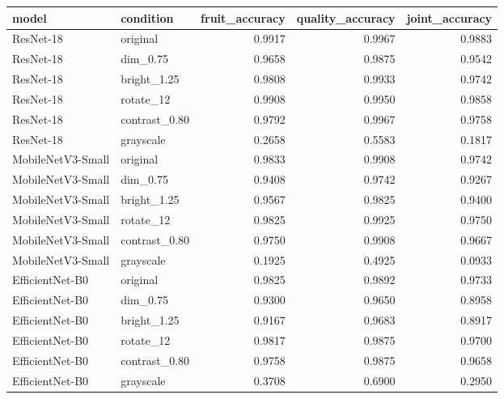 \begin{tabular}{llrrr}
\toprule
model & condition & fruit_accuracy & quality_accuracy & joint_accuracy \\
\midrule
ResNet-18 & original & 0.9917 & 0.9967 & 0.9883 \\
ResNet-18 & dim_0.75 & 0.9658 & 0.9875 & 0.9542 \\
ResNet-18 & bright_1.25 & 0.9808 & 0.9933 & 0.9742 \\
ResNet-18 & rotate_12 & 0.9908 & 0.9950 & 0.9858 \\
ResNet-18 & contrast_0.80 & 0.9792 & 0.9967 & 0.9758 \\
ResNet-18 & grayscale & 0.2658 & 0.5583 & 0.1817 \\
MobileNetV3-Small & original & 0.9833 & 0.9908 & 0.9742 \\
MobileNetV3-Small & dim_0.75 & 0.9408 & 0.9742 & 0.9267 \\
MobileNetV3-Small & bright_1.25 & 0.9567 & 0.9825 & 0.9400 \\
MobileNetV3-Small & rotate_12 & 0.9825 & 0.9925 & 0.9750 \\
MobileNetV3-Small & contrast_0.80 & 0.9750 & 0.9908 & 0.9667 \\
MobileNetV3-Small & grayscale & 0.1925 & 0.4925 & 0.0933 \\
EfficientNet-B0 & original & 0.9825 & 0.9892 & 0.9733 \\
EfficientNet-B0 & dim_0.75 & 0.9300 & 0.9650 & 0.8958 \\
EfficientNet-B0 & bright_1.25 & 0.9167 & 0.9683 & 0.8917 \\
EfficientNet-B0 & rotate_12 & 0.9817 & 0.9875 & 0.9700 \\
EfficientNet-B0 & contrast_0.80 & 0.9758 & 0.9875 & 0.9658 \\
EfficientNet-B0 & grayscale & 0.3708 & 0.6900 & 0.2950 \\
\bottomrule
\end{tabular}

